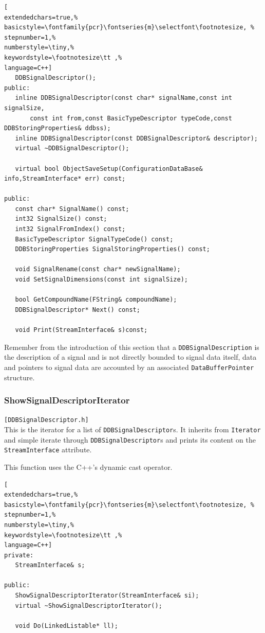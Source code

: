 \begin{lstlisting}[
extendedchars=true,%
basicstyle=\fontfamily{pcr}\fontseries{m}\selectfont\footnotesize, %
stepnumber=1,%
numberstyle=\tiny,%
keywordstyle=\footnotesize\tt ,%
language=C++]
   DDBSignalDescriptor();
public:
   inline DDBSignalDescriptor(const char* signalName,const int signalSize,
       const int from,const BasicTypeDescriptor typeCode,const DDBStoringProperties& ddbss);
   inline DDBSignalDescriptor(const DDBSignalDescriptor& descriptor);
   virtual ~DDBSignalDescriptor();

   virtual bool ObjectSaveSetup(ConfigurationDataBase& info,StreamInterface* err) const;

public:
   const char* SignalName() const;
   int32 SignalSize() const;
   int32 SignalFromIndex() const;
   BasicTypeDescriptor SignalTypeCode() const;
   DDBStoringProperties SignalStoringProperties() const;

   void SignalRename(const char* newSignalName);
   void SetSignalDimensions(const int signalSize);

   bool GetCompoundName(FString& compoundName);
   DDBSignalDescriptor* Next() const;

   void Print(StreamInterface& s)const;
\end{lstlisting}

Remember from the introduction of this section that a \texttt{DDBSignalDescription} is the description of a signal and is not directly bounded to signal data itself, data and pointers to signal data are accounted by an associated \texttt{DataBufferPointer} structure.



\subsubsection{ShowSignalDescriptorIterator}
\texttt{[DDBSignalDescriptor.h]}\\
This is the iterator for a list of \texttt{DDBSignalDescriptor}s. It inherits from \texttt{Iterator} and simple iterate through \texttt{DDBSignalDescriptor}s and prints its content on the \texttt{StreamInterface} attribute.

This function uses the C++'s dynamic cast operator.

\begin{lstlisting}[
extendedchars=true,%
basicstyle=\fontfamily{pcr}\fontseries{m}\selectfont\footnotesize, %
stepnumber=1,%
numberstyle=\tiny,%
keywordstyle=\footnotesize\tt ,%
language=C++]
private:
   StreamInterface& s;

public:
   ShowSignalDescriptorIterator(StreamInterface& si);
   virtual ~ShowSignalDescriptorIterator();

   void Do(LinkedListable* ll);
\end{lstlisting}




